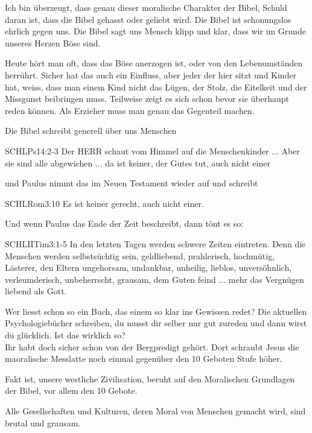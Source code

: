 \documentclass[fontsize=16pt]{mybib}
\begin{document}
\begin{otsblock}
    Ich bin überzeugt, dass genau dieser moralische Charakter der Bibel, Schuld daran ist, dass die Bibel gehasst oder geliebt wird. Die Bibel ist schonungslos ehrlich gegen uns. Die Bibel sagt uns Mensch klipp und klar, dass wir im Grunde unseres Herzen Böse sind.

    Heute hört man oft, dass das Böse anerzogen ist, oder von den Lebenumständen herrührt. Sicher hat das auch ein Einfluss, aber jeder der hier sitzt und Kinder hat, weiss, dass man einem Kind nicht das Lügen, der Stolz, die Eitelkeit und der Missgunst beibringen muss. Teilweise zeigt es sich schon bevor sie überhaupt reden können. Als Erzieher muss man genau das Gegenteil machen.

  Die Bibel schreibt generell über uns Menschen
    \begin{bibelbox}{SCHL}{Ps}{14:2-3}
        Der HERR schaut vom Himmel auf die Menschenkinder ... Aber sie sind alle abgewichen ... da ist keiner, der Gutes tut, auch nicht einer
    \end{bibelbox}
    und Paulus nimmt das im Neuen Testament wieder auf und schreibt
    \begin{bibelbox}{SCHL}{Rom}{3:10}
        Es ist keiner gerecht, auch nicht einer.
    \end{bibelbox}

    Und wenn Paulus das Ende der Zeit beschreibt, dann tönt es so:
    \begin{bibelbox}{SCHL}{IITim}{3:1-5}
        In den letzten Tagen werden schwere Zeiten eintreten. Denn die Menschen werden selbstsüchtig sein, geldliebend, prahlerisch, hochmütig, Lästerer, den Eltern ungehorsam, undankbar, unheilig, lieblos, unversöhnlich, verleumderisch, unbeherrscht, grausam, dem Guten feind ... mehr das Vergnügen liebend als Gott.
    \end{bibelbox}
    Wer liesst schon so ein Buch, das einem so klar ins Gewissen redet? Die aktuellen Psychologiebücher schreiben, du musst dir selber nur gut zureden und dann wirst du glücklich. Ist das wirklich so?\\
    Ihr habt doch sicher schon von der Bergpredigt gehört. Dort schraubt Jesus die maoralische Messlatte noch einmal gegenüber den 10 Geboten Stufe höher.

    Fakt ist, unsere westliche Zivilisation, beruht auf den Moralischen Grundlagen der Bibel, vor allem den 10 Gebote.

    Alle Gesellschaften und Kulturen, deren Moral von Menschen gemacht wird, sind brutal und grausam.


\end{otsblock}
\end{document}
